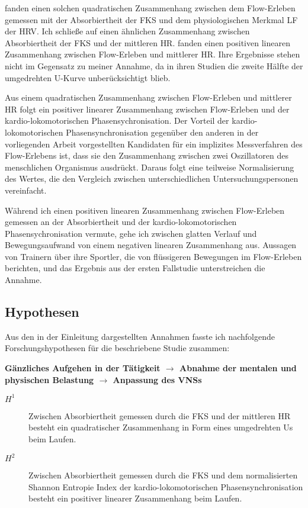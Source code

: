 \citet{Peifer2014} fanden einen solchen quadratischen Zusammenhang zwischen dem Flow-Erleben gemessen mit der Absorbiertheit der \ac{FKS} und dem physiologischen Merkmal \ac{LF} der \ac{HRV}. Ich schließe auf einen ähnlichen Zusammenhang zwischen Absorbiertheit der \ac{FKS} und der mittleren \ac{HR}. \citet{deManzano2010, Gaggioli2013} fanden einen positiven linearen Zusammenhang zwischen Flow-Erleben und mittlerer \ac{HR}. Ihre Ergebnisse stehen nicht im Gegensatz zu meiner Annahme, da in ihren Studien die zweite Hälfte der umgedrehten U-Kurve unberücksichtigt blieb.

Aus einem quadratischen Zusammenhang zwischen Flow-Erleben und mittlerer \ac{HR} folgt ein positiver linearer Zusammenhang zwischen Flow-Erleben und der kardio-lokomotorischen Phasensychronisation. Der Vorteil der kardio-lokomotorischen Phasensynchronisation gegenüber den anderen in der vorliegenden Arbeit vorgestellten Kandidaten für ein implizites Messverfahren des Flow-Erlebens ist, dass sie den Zusammenhang zwischen zwei Oszillatoren des menschlichen Organismus ausdrückt. Daraus folgt eine teilweise Normalisierung des Wertes, die den Vergleich zwischen unterschiedlichen Untersuchungspersonen vereinfacht.

Während ich einen positiven linearen Zusammenhang zwischen Flow-Erleben gemessen an der Absorbiertheit und der kardio-lokomotorischen Phasensychronisation vermute, gehe ich zwischen glatten Verlauf und Bewegungsaufwand von einem negativen linearen Zusammenhang aus. Aussagen von Trainern über ihre Sportler, die von flüssigeren Bewegungen im Flow-Erleben berichten, und das Ergebnis aus der ersten Fallstudie unterstreichen die Annahme.

\subsection{Hypothesen}
Aus den in der Einleitung dargestellten Annahmen fasste ich nachfolgende Forschungshypothesen für die beschriebene Studie zusammen:

\textbf{Gänzliches Aufgehen in der Tätigkeit $\rightarrow$ Abnahme der mentalen und physischen Belastung $\rightarrow$ Anpassung des VNSs}
\begin{description}
	\item[$H^1$] Zwischen Absorbiertheit gemessen durch die \ac{FKS} und der mittleren \ac{HR} besteht ein quadratischer Zusammenhang in Form eines umgedrehten Us beim Laufen.
	\item[$H^2$] Zwischen Absorbiertheit gemessen durch die \ac{FKS} und dem normalisierten Shannon Entropie Index der kardio-lokomotorischen Phasensynchronisation besteht ein positiver linearer Zusammenhang beim Laufen.
\end{description}

